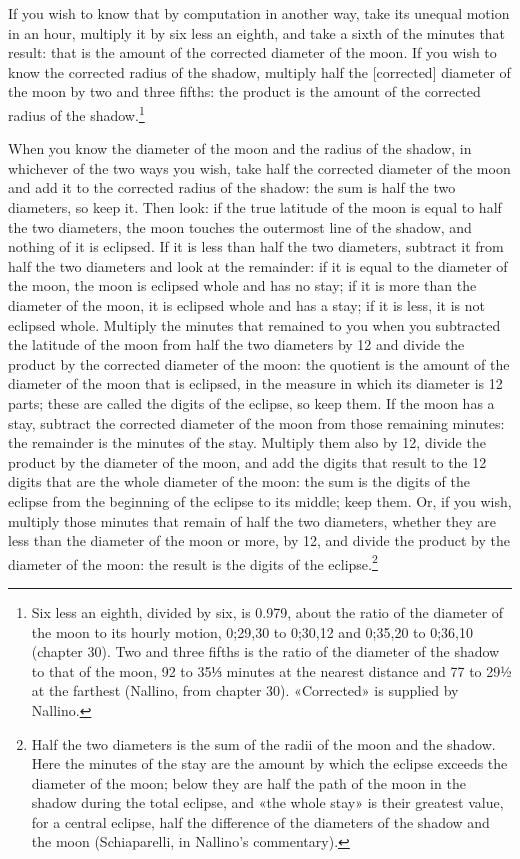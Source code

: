 \documentclass[11pt]{article}
\begin{document}
\par If you wish to know that by computation in another way, take its unequal motion in an hour, multiply it by six less an eighth, and take a sixth of the minutes that result: that is the amount of the corrected diameter of the moon. If you wish to know the corrected radius of the shadow, multiply half the [corrected] diameter of the moon by two and three fifths: the product is the amount of the corrected radius of the shadow.\footnote{Six less an eighth, divided by six, is 0.979, about the ratio of the diameter of the moon to its hourly motion, 0;29,30 to 0;30,12 and 0;35,20 to 0;36,10 (chapter 30). Two and three fifths is the ratio of the diameter of the shadow to that of the moon, 92 to 35⅓ minutes at the nearest distance and 77 to 29½ at the farthest (Nallino, from chapter 30). «Corrected» is supplied by Nallino.}\par
\par When you know the diameter of the moon and the radius of the shadow, in whichever of the two ways you wish, take half the corrected diameter of the moon and add it to the corrected radius of the shadow: the sum is half the two diameters, so keep it. Then look: if the true latitude of the moon is equal to half the two diameters, the moon touches the outermost line of the shadow, and nothing of it is eclipsed. If it is less than half the two diameters, subtract it from half the two diameters and look at the remainder: if it is equal to the diameter of the moon, the moon is eclipsed whole and has no stay; if it is more than the diameter of the moon, it is eclipsed whole and has a stay; if it is less, it is not eclipsed whole. Multiply the minutes that remained to you when you subtracted the latitude of the moon from half the two diameters by 12 and divide the product by the corrected diameter of the moon: the quotient is the amount of the diameter of the moon that is eclipsed, in the measure in which its diameter is 12 parts; these are called the digits of the eclipse, so keep them. If the moon has a stay, subtract the corrected diameter of the moon from those remaining minutes: the remainder is the minutes of the stay. Multiply them also by 12, divide the product by the diameter of the moon, and add the digits that result to the 12 digits that are the whole diameter of the moon: the sum is the digits of the eclipse from the beginning of the eclipse to its middle; keep them. Or, if you wish, multiply those minutes that remain of half the two diameters, whether they are less than the diameter of the moon or more, by 12, and divide the product by the diameter of the moon: the result is the digits of the eclipse.\footnote{Half the two diameters is the sum of the radii of the moon and the shadow. Here the minutes of the stay are the amount by which the eclipse exceeds the diameter of the moon; below they are half the path of the moon in the shadow during the total eclipse, and «the whole stay» is their greatest value, for a central eclipse, half the difference of the diameters of the shadow and the moon (Schiaparelli, in Nallino's commentary).}\par
\end{document}
